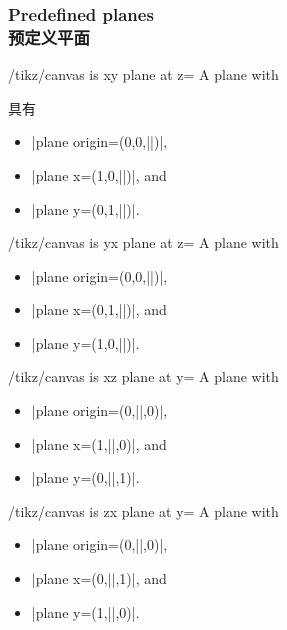 \subsubsection{Predefined planes\\预定义平面}

\begin{key}{/tikz/canvas is xy plane at z=}
    A plane with
    
    具有

    \begin{itemize}
        \item |plane origin={(0,0,||)}|,
        \item |plane x={(1,0,||)}|, and
        \item |plane y={(0,1,||)}|.
    \end{itemize}
\end{key}

\begin{key}{/tikz/canvas is yx plane at z=}
    A plane with
    \begin{itemize}
        \item |plane origin={(0,0,||)}|,
        \item |plane x={(0,1,||)}|, and
        \item |plane y={(1,0,||)}|.
    \end{itemize}
\end{key}

\begin{key}{/tikz/canvas is xz plane at y=}
    A plane with
    \begin{itemize}
        \item |plane origin={(0,||,0)}|,
        \item |plane x={(1,||,0)}|, and
        \item |plane y={(0,||,1)}|.
    \end{itemize}
\end{key}

\begin{key}{/tikz/canvas is zx plane at y=}
    A plane with
    \begin{itemize}
        \item |plane origin={(0,||,0)}|,
        \item |plane x={(0,||,1)}|, and
        \item |plane y={(1,||,0)}|.
    \end{itemize}
\end{key}

